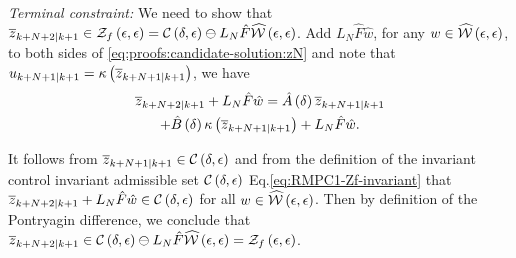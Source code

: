 \noindent\textit{Terminal constraint:}
%
We need to show that $\overline{z}_{k+N+2| k+1}\in\mathcal{Z}_{f}\left(\epsilon,\epsilon\right)=\mathcal{C}\left(\delta,\epsilon\right)\ominus L_{N}\hat{F}\widehat{\mathcal{W}}\left(\epsilon,\epsilon\right)$.
Add $L_{N}\hat{F}\hat{w}$, for any $w\in\widehat{\mathcal{W}}\left(\epsilon,\epsilon\right)$,
to both sides of \eqref{eq:proofs:candidate-solution:zN} and note that
$u_{k+N+1| k+1}=\kappa\left(\overline{z}_{k+N+1| k+1}\right)$,
we have 
\begin{multline*}
  \overline{z}_{k+N+2|
    k+1}+L_{N}\hat{F}\hat{w}=\hat{A}\left(\delta\right)\overline{z}_{k+N+1| k+1} \\
  +\hat{B}\left(\delta\right)\kappa\left(\overline{z}_{k+N+1| k+1}\right)+L_{N}\hat{F}\hat{w}\text{.}
\end{multline*}


 It follows from $\overline{z}_{k+N+1| k+1}\in\mathcal{C}\left(\delta,\epsilon\right)$
and from the definition of the invariant control invariant admissible
set $\mathcal{C}\left(\delta,\epsilon\right)$ Eq.\eqref{eq:RMPC1-Zf-invariant}
that $\overline{z}_{k+N+2| k+1}+L_{N}\hat{F}\hat{w}\in\mathcal{C}\left(\delta,\epsilon\right)$
for all $w\in\widehat{\mathcal{W}}\left(\epsilon,\epsilon\right)$. Then by definition
of the Pontryagin difference, we conclude that $\overline{z}_{k+N+2| k+1}\in\mathcal{C}\left(\delta,\epsilon\right)\ominus L_{N}\hat{F}\widehat{\mathcal{W}}\left(\epsilon,\epsilon\right)=\mathcal{Z}_{f}\left(\epsilon,\epsilon\right)$.


